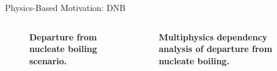 \documentclass{beamer}
\begin{document}
\begin{frame}{Physics-Based Motivation: DNB}

  \begin{columns}

    \begin{column}{0.35\textwidth}
      \begin{figure}[htpb!]
        \begin{center}
          \scalebox{1}{  }
        \end{center}
        \caption{\textbf{Departure from nucleate boiling scenario.} }
      \end{figure}
    \end{column}

    \pause

    \begin{column}{0.65\textwidth}
      \begin{figure}[htpb!]
        \begin{center}
          \scalebox{0.8}{  }
        \end{center}
        \caption{\textbf{Multiphysics dependency analysis of departure
            from nucleate boiling.} }
      \end{figure}
    \end{column}

  \end{columns}

\end{frame}
\end{document}
